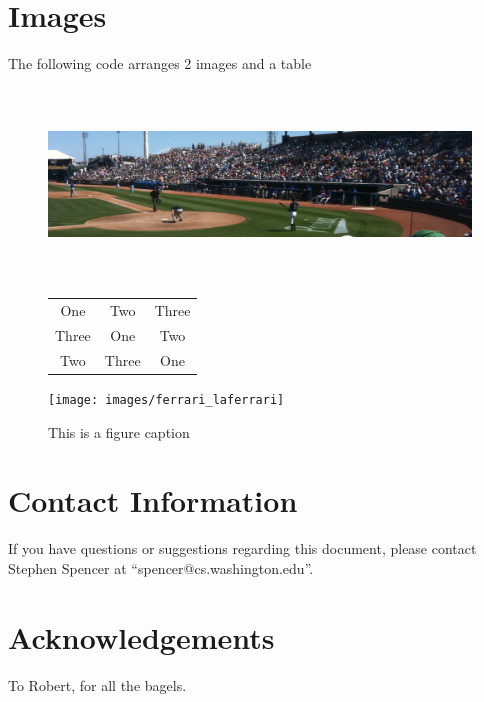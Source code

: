 \documentclass[tog]{acmsiggraph}
\begin{document}
\section{Images}
The following code arranges 2 images and a table
\begin{figure}
\centering\includegraphics[width=.9\linewidth,height=2in]{images/sampleteaser}\par
\caption{This is a figure caption}

\vspace*{\floatsep}

\begin{minipage}{.5\linewidth}
\centering
\begin{tabular}{ccc}
\hline
One & Two & Three \\
Three & One & Two \\
Two & Three & One \\
\hline
\end{tabular}
\end{minipage}%
\begin{minipage}{.5\linewidth}
\centering\texttt{[image: images/ferrari\_laferrari]}
\end{minipage}
\end{figure}

\section{Contact Information}

If you have questions or suggestions regarding this document, please
contact Stephen Spencer at ``spencer@cs.washington.edu''.

\section*{Acknowledgements}

To Robert, for all the bagels.


\nocite{*}

\end{document}
